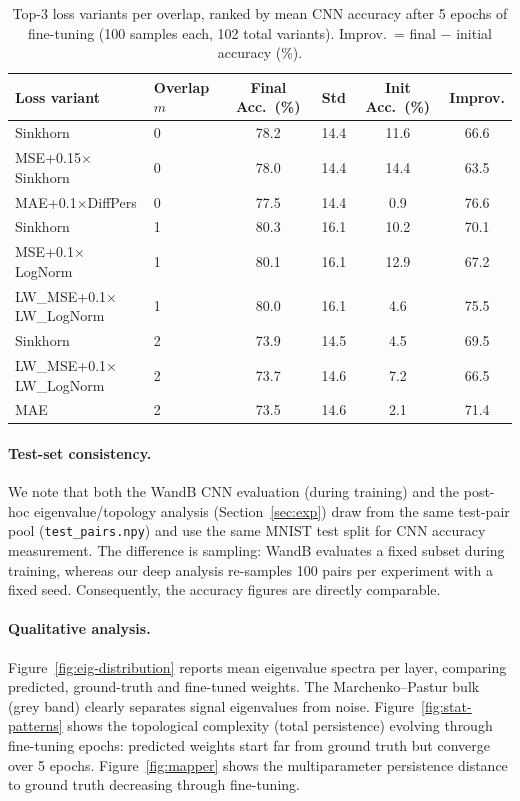 \documentclass{article}
\begin{document}
\begin{table}[t]
  \centering
  \caption{Top-3 loss variants per overlap, ranked by mean CNN accuracy
  after 5 epochs of fine-tuning (100 samples each, 102 total variants).
  Improv.\ = final $-$ initial accuracy (\%).}
  \label{tab:layer-mean-std}
  \begin{tabular}{llcccc}
    \toprule
    Loss variant & Overlap $m$ & Final Acc.~(\%) & Std & Init Acc.~(\%) & Improv. \\
    \midrule
    Sinkhorn & 0 & 78.2 & 14.4 & 11.6 & 66.6 \\
    MSE+0.15$\times$Sinkhorn & 0 & 78.0 & 14.4 & 14.4 & 63.5 \\
    MAE+0.1$\times$DiffPers & 0 & 77.5 & 14.4 & 0.9 & 76.6 \\
    \midrule
    Sinkhorn & 1 & 80.3 & 16.1 & 10.2 & 70.1 \\
    MSE+0.1$\times$LogNorm & 1 & 80.1 & 16.1 & 12.9 & 67.2 \\
    LW\_MSE+0.1$\times$LW\_LogNorm & 1 & 80.0 & 16.1 & 4.6 & 75.5 \\
    \midrule
    Sinkhorn & 2 & 73.9 & 14.5 & 4.5 & 69.5 \\
    LW\_MSE+0.1$\times$LW\_LogNorm & 2 & 73.7 & 14.6 & 7.2 & 66.5 \\
    MAE & 2 & 73.5 & 14.6 & 2.1 & 71.4 \\
    \bottomrule
  \end{tabular}
\end{table}

\paragraph{Test-set consistency.}
We note that both the WandB CNN evaluation (during training) and the
post-hoc eigenvalue/topology analysis (Section~\ref{sec:exp}) draw from
the same test-pair pool (\texttt{test\_pairs.npy}) and use the same
MNIST test split for CNN accuracy measurement.  The difference is
sampling: WandB evaluates a fixed subset during training, whereas our
deep analysis re-samples 100 pairs per experiment with a fixed seed.
Consequently, the accuracy figures are directly comparable.

\paragraph{Qualitative analysis.}
Figure~\ref{fig:eig-distribution} reports mean eigenvalue spectra per
layer, comparing predicted, ground-truth and fine-tuned weights.  The
Marchenko--Pastur bulk (grey band) clearly separates signal eigenvalues
from noise.  Figure~\ref{fig:stat-patterns} shows the topological
complexity (total persistence) evolving through fine-tuning epochs:
predicted weights start far from ground truth but converge over 5
epochs. Figure~\ref{fig:mapper} shows the multiparameter persistence
distance to ground truth decreasing through fine-tuning.
\end{document}
